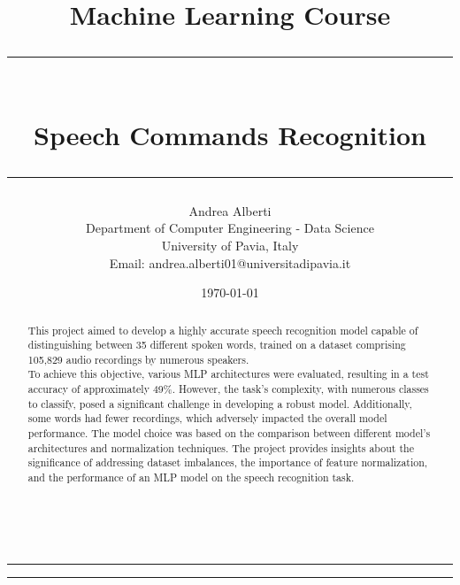 \documentclass{article}
\title{\Large Machine Learning Course\vspace{0.8cm}\\
    \rule{\textwidth}{0.3pt}\vspace{0.3cm}\\
    \textbf{Speech Commands Recognition}\vspace{0.1cm}\\
    \rule{\textwidth}{0.3pt}\vspace{0.8cm}}
\author{Andrea Alberti\vspace{0.5cm}\\
    \small Department of Computer Engineering - Data Science\\[0.2cm]
    \small University of Pavia, Italy \\
    \small Email: andrea.alberti01@universitadipavia.it}\vspace{0.5cm}
\date{\today}
\begin{document}
\begin{titlepage}
   
        \maketitle
        \thispagestyle{empty}

    \begin{multicols*}{2}
            
        \hrule
        \begin{abstract}
        \noindent
        This project aimed to develop a highly accurate speech recognition model capable of distinguishing between 35 different spoken words, trained on a 
        dataset comprising 105,829 audio recordings by numerous speakers. \\
        To achieve this objective, various MLP architectures were evaluated, resulting in 
        a test accuracy of approximately 49\%. However, the task's complexity, with numerous classes to classify, posed a significant challenge in developing 
        a robust model. Additionally, some words had fewer recordings, which adversely impacted the overall model performance. 
        The model choice was based on the comparison between different model's architectures and normalization techniques.
        The project provides insights about the significance of addressing dataset imbalances, the importance of feature normalization, and the 
        performance of an MLP model on the speech recognition task.
        \\
        \\
        \\
        \end{abstract}
     \newcolumn
        \hrule\vspace{0.1cm}
        \tableofcontents
    \end{multicols*}

\end{titlepage}

\newpage
{}



\end{document}
